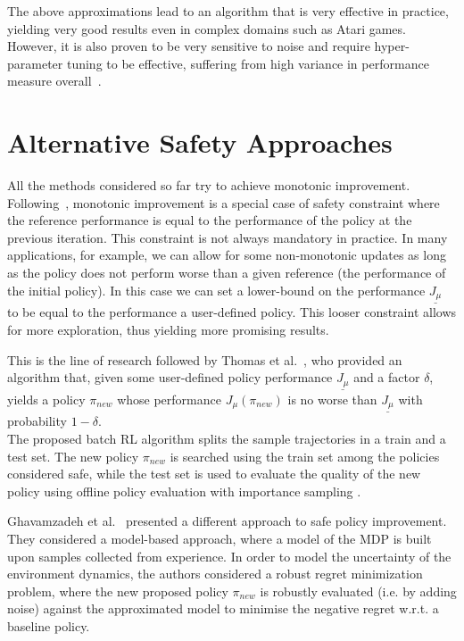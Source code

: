 The above approximations lead to an algorithm that is very effective in practice, yielding very good results even in complex domains such as Atari games. However, it is also proven to be very sensitive to noise and require hyper-parameter tuning to be effective, suffering from high variance in performance measure overall~\cite{2017arXiv170804133I}.

\section{Alternative Safety Approaches}
\label{sec:other-safe}
All the methods considered so far try to achieve monotonic improvement. Following~, monotonic improvement is a special case of safety constraint where the reference performance is equal to the performance of the policy at the previous iteration. This constraint is not always mandatory in practice. In many applications, for example, we can allow for some non-monotonic updates as long as the policy does not perform worse than a given reference (\eg the performance of the initial policy). In this case we can set a lower-bound on the performance $\underline{J_\mu}$ to be equal to the performance a user-defined policy. This looser constraint allows for more exploration, thus yielding more promising results. 

This is the line of research followed by Thomas et al.~\cite{pmlr-v37-thomas15}, who provided an algorithm that, given some user-defined policy performance $\underline{J_\mu}$ and a factor $\delta$, yields a policy $\pi_{new}$ whose performance $J_\mu(\pi_{new})$ is no worse than $\underline{J_\mu}$ with probability $1-\delta$.\\
The proposed batch RL algorithm splits the sample trajectories in a train and a test set. The new policy $\pi_{new}$ is searched using the train set among the policies considered safe, while the test set is used to evaluate the quality of the new policy using offline policy evaluation with importance sampling \cite{Precup:2000:ETO:645529.658134}. 

Ghavamzadeh et al.~\cite{Petrik:2016:SPI:3157096.3157354} presented a different approach to safe policy improvement. They considered a model-based approach, where a model of the MDP is built upon samples collected from experience. In order to model the uncertainty of the environment dynamics, the authors considered a robust regret minimization problem, where the new proposed policy $\pi_{new}$ is robustly evaluated (i.e. by adding noise) against the approximated model to minimise the negative regret w.r.t. a baseline policy. 

